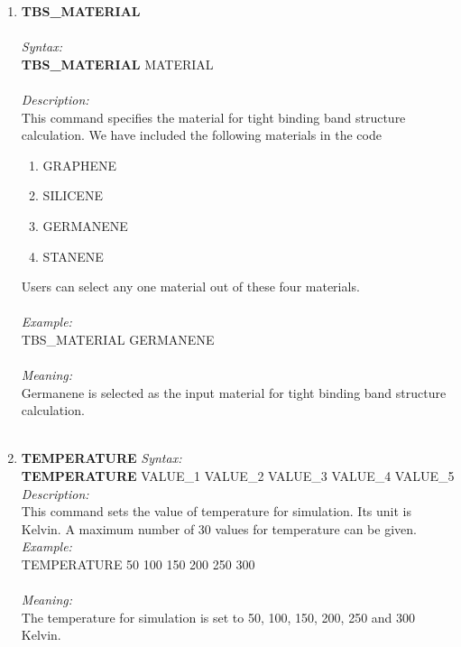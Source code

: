 \documentclass[12pt]{article}
\begin{document}
\begin{enumerate}
    \item \textbf{TBS\_MATERIAL}   \\ \\
    \textit{Syntax:} \\
    \textbf{TBS\_MATERIAL} MATERIAL \\ \\
    \textit{Description:} \\
    This command specifies the material for tight binding band structure calculation. We have included the following materials in the code
    \begin{enumerate}
        \item GRAPHENE
        \item SILICENE 
        \item GERMANENE
        \item STANENE 
    \end{enumerate}
    Users can select any one material out of these four materials. \\ \\
    \textit{Example:} \\
    TBS\_MATERIAL GERMANENE \\ \\
    \textit{Meaning:} \\   
    Germanene is selected as the input material for tight binding band structure calculation. \\ \\ 

    \item 
    \textbf{TEMPERATURE}
    \textit{Syntax:} \\
    \textbf{TEMPERATURE} VALUE\_1 VALUE\_2 VALUE\_3 VALUE\_4 VALUE\_5 \\
    
    \textit{Description:} \\
    This command sets the value of temperature for simulation. Its unit is Kelvin. A maximum number of 30 values for temperature can be given. \\
    \textit{Example:} \\
    TEMPERATURE 50 100 150 200 250 300 \\ \\
    \textit{Meaning:} \\  The temperature for simulation is set to 50, 100, 150, 200, 250 and 300 Kelvin.
     \\ \\    


\end{enumerate}
\end{document}
